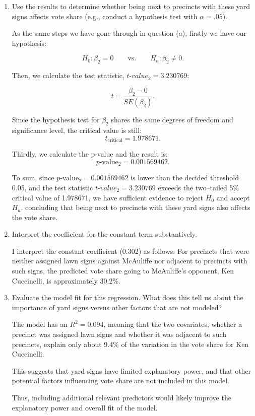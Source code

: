 \documentclass[12pt,letterpaper]{article}
\begin{document}
\begin{enumerate}
		\item [(b)] Use the results to determine whether being next to precincts with these yard signs affects vote share (e.g., conduct a hypothesis test with $\alpha = .05$).
		
		As the same steps we have gone through in question (a), firstly we have our hypothesis:
		
		\[
		H_0: \beta_2 = 0 \qquad\text{vs.}\qquad H_a: \beta_2 \neq 0.
		\]
		
		Then, we calculate the test statistic, $\textit{t-value}_2 = 3.230769$:
		
		\[
		t = \frac{\beta_2 - 0}{SE(\beta_2)}.
		\]
		
		Since the hypothesis test for $\beta_2$ shares the same degrees of freedom and significance level, the critical value is still:
		\[
		t_{\text{critical}} = 1.978671.
		\]
		
		
		
		Thirdly, we calculate the p-value and the result is:
		\[
		p\text{-value}_2 = 0.001569462.
		\]
		
		
		
		To sum, since $p\text{-value}_2 = 0.001569462$ is lower than the decided threshold 0.05, and the test statistic $\textit{t-value}_2 = 3.230769$ exceeds the two–tailed 5\% critical value of 1.978671, we have sufficient evidence to reject $H_0$ and accept $H_a$, concluding that being next to precincts with these yard signs also affects the vote share.
		
		\item [(c)] Interpret the coefficient for the constant term substantively.
		
		I interpret the constant coefficient (0.302) as follows: For precincts that were neither assigned lawn signs against McAuliffe nor adjacent to precincts with such signs, the predicted vote share going to McAuliffe's opponent, Ken Cuccinelli, is approximately 30.2\%.
		
		\item [(d)] Evaluate the model fit for this regression. What does this tell us about the importance of yard signs versus other factors that are not modeled?
		
		The model has an $R^2 = 0.094$, meaning that the two covariates, whether a precinct was assigned lawn signs and whether it was adjacent to such precincts, explain only about 9.4\% of the variation in the vote share for Ken Cuccinelli.
		
		This suggests that yard signs have limited explanatory power, and that other potential factors influencing vote share are not included in this model.
		
		Thus, including additional relevant predictors would likely improve the explanatory power and overall fit of the model.
		
	\end{enumerate}
	
\end{document}
